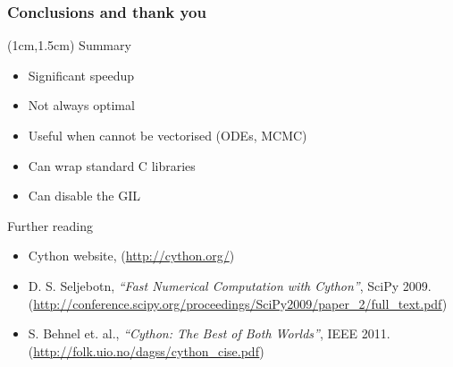 \documentclass[xcolor=pdftex,dvipsnames]{beamer}
\begin{document}
\begin{frame}
    \frametitle{Conclusions and thank you}
    \begin{textblock*}{12cm}(1cm,1.5cm) %
      Summary
      \begin{itemize}
        \item Significant speedup
        \item Not always optimal
        \item Useful when cannot be vectorised (ODEs, MCMC)
        \item Can wrap standard C libraries
        \item Can disable the GIL
    \end{itemize}
  \vspace{0.5cm}
  Further reading
  \begin{itemize}
    \item Cython website, (\url{http://cython.org/})
    \item D. S. Seljebotn, \textit{``Fast Numerical Computation with Cython''}, SciPy 2009.{ (\url{http://conference.scipy.org/proceedings/SciPy2009/paper\_2/full\_text.pdf})}
    \item S. Behnel et. al., \textit{``Cython: The Best of Both Worlds''}, IEEE 2011. (\url{http://folk.uio.no/dagss/cython_cise.pdf})
  \end{itemize}

    \end{textblock*}
\end{frame}

\end{document}
